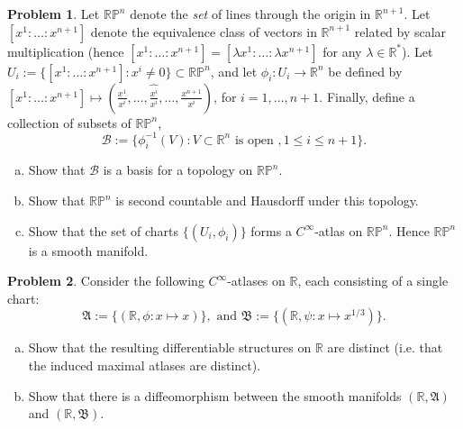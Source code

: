 \documentclass{amsart}
\newcommand{\+}[1]{\ensuremath{\mathbf{#1}}}
\renewcommand{\P}{{\mathbb P}}
\newcommand{\R}{{\mathbb R}}
\theoremstyle{definition}
\newtheorem{prob}{Problem}
\begin{document}
\begin{prob}
 Let $\R \P^n$ denote the \emph{set} of 
 lines through the origin in $\R^{n+1}$.
 Let $[x^1:\ldots:x^{n+1}]$ denote the
 equivalence class of vectors in $\R^{n+1}$ related by
 scalar multiplication
 (hence $[x^1:\ldots:x^{n+1}] = [\lambda x^1: 
 \ldots: \lambda x^{n+1}]$ for
 any $\lambda \in \R^*$).
 Let $U_i := \{[x^1:\ldots:x^{n+1}] : x^i \neq 0\} \subset
 \R\P^n$,
 and let $\phi_i : U_i \to \R^{n}$ be defined by
 $[x^1:\ldots:x^{n+1}] \mapsto (\frac{x^1}{x^i},\ldots,
 \widehat{\frac{x^i}{x^i}},\ldots, \frac{x^{n+1}}{x^i})$,
  for $i = 1,\ldots,n+1$.  
 Finally, define a collection of subsets of $\R \P^n$,
  \[\mathcal{B} := \{\phi_i^{-1}(V): V \subset \R^n 
  \text{ is open },  1 \leq i \leq n+1\}.\]
  \begin{enumerate}[(a)]
   \item Show that $\mathcal{B}$ is a basis for a topology on 
   $\R \P^n$.
   \item Show that $\R \P^n$ is second countable and Hausdorff
   under this topology.
   \item Show that the set of charts $\{(U_i,\phi_i)\}$ forms a 
   $C^\infty$-atlas on $\R \P^n$.  Hence $\R \P^n$ is a smooth manifold.
  \end{enumerate}

\end{prob}




\begin{prob}
Consider the following $C^\infty$-atlases on $\R$,
each consisting of a single chart:
\[
\mathfrak{A} := \{(\R, \phi: x \mapsto x)\}, \text{ and }
\mathfrak{B} := \{(\R, \psi: x \mapsto x^{1/3})\}.
\]
\begin{enumerate}[(a)]
 \item Show that the resulting differentiable structures on $\R$
 are distinct (i.e. that the induced maximal atlases are
 distinct).
 \item Show that there is a diffeomorphism between the smooth
 manifolds $(\R, \mathfrak{A})$ and $(\R, \mathfrak{B})$.
\end{enumerate}
\end{prob}
\end{document}
